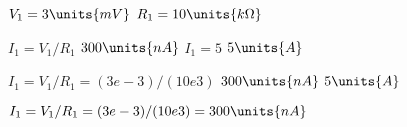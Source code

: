 
\mbox{$V_{1}=\mbox{$3 \units{m V}$}$} \mbox{$R_{1}=\mbox{$10 \units{k \Omega}$}$}

\mbox{$I_{1}=V_{1}/R_{1} $} \mbox{$300 \units{n A}$} \mbox{$I_{1}=5 $} \mbox{$5 \units{ A}$}

\mbox{$I_{1}=V_{1}/R_{1}  = (3e-3)/(10e3)$} \mbox{$300 \units{n A}$}  \mbox{$5 \units{ A}$}

\mbox{$I_{1}=V_{1}/R_{1}  = (3e-3)/(10e3) = \mbox{$300 \units{n A}$}$}

